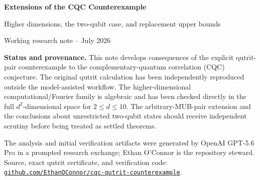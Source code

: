 \documentclass[10pt,letterpaper]{article}
\begin{document}
\begin{center}
  {\LARGE\bfseries Extensions of the CQC Counterexample}\par
  \vspace{0.25em}
  {\large Higher dimensions, the two-qubit case, and replacement upper bounds}\par
  \vspace{0.25em}
  {\small Working research note -- July 2026}
\end{center}

\begin{tcolorbox}[colback=cqcpale,colframe=cqcblue!60!black,boxrule=0.55pt,arc=1.5pt,left=6pt,right=6pt,top=5pt,bottom=5pt]
\textbf{Status and provenance.}
This note develops consequences of the explicit qutrit-pair counterexample to the complementary-quantum correlation (CQC) conjecture. The original qutrit calculation has been independently reproduced outside the model-assisted workflow. The higher-dimensional computational/Fourier family is algebraic and has been checked directly in the full $d^2$-dimensional space for $2\le d\le 10$. The arbitrary-MUB-pair extension and the conclusions about unrestricted two-qubit states should receive independent scrutiny before being treated as settled theorems.

The analysis and initial verification artifacts were generated by OpenAI GPT-5.6 Pro in a prompted research exchange; Ethan O'Connor is the repository steward. Source, exact qutrit certificate, and verification code:
\href{https://github.com/EthanOConnor/cqc-qutrit-counterexample}{\texttt{github.com/EthanOConnor/cqc-qutrit-counterexample}}.
\end{tcolorbox}

\tableofcontents
\vspace{0.5em}




\end{document}
